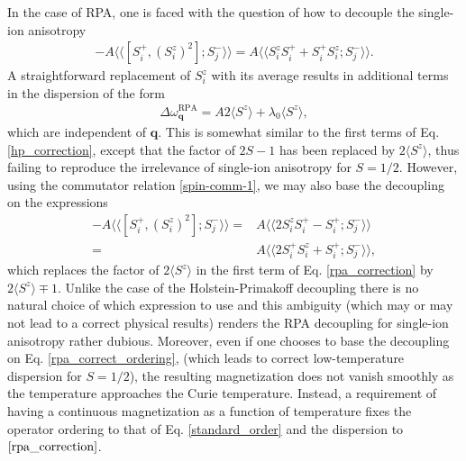 \documentclass[aps,prb,reprint,floatfix,superscriptaddress]{revtex4-2}
\begin{document}
In the case of RPA, 
one is faced with the question of how to decouple the single-ion anisotropy
\begin{align}\label{standard_order}
-A\langle\langle[S^+_i,(S^z_i)^2];S^-_j\rangle\rangle=A\langle\langle S^z_iS^+_i+S^+_iS^z_i;S^-_j\rangle\rangle.
\end{align}
A straightforward replacement of $S^z_i$ with its average
results in additional terms in the dispersion of the form
\begin{align}\label{rpa_correction}
    \Delta\omega^\mathrm{RPA}_\mathbf{q} =A2\langle S^z\rangle+\lambda_0\langle S^z\rangle,
\end{align}
which are independent of $\mathbf{q}$. This is somewhat similar to the first terms of Eq. \eqref{hp_correction}, except that the factor of $2S-1$ has been replaced by $2\langle S^z\rangle$, thus failing to reproduce the irrelevance of single-ion anisotropy for $S=1/2$. 
However, using the commutator relation \eqref{spin-comm-1}, we may also base the decoupling on the expressions
\begin{align}
-A\langle\langle[S^+_i,(S^z_i)^2];S^-_j\rangle\rangle=&A\langle\langle 2S^z_iS^+_i-S^+_i;S^-_j\rangle\rangle\label{rpa_correct_ordering}\\
=&A\langle\langle 2S^+_iS^z_i+S^+_i;S^-_j\rangle\rangle,
\end{align}
which replaces the factor of $2\langle S^z\rangle$ in the first term of Eq. \eqref{rpa_correction} by $2\langle S^z\rangle\mp1$. 
Unlike the case of the Holstein-Primakoff decoupling there is no natural choice of which expression to use and this ambiguity (which may or may not lead to a correct physical results) renders the RPA decoupling for single-ion anisotropy rather dubious. Moreover, even 
if one chooses to base the decoupling on Eq. \eqref{rpa_correct_ordering}, (which leads to correct low-temperature dispersion for $S=1/2$), 
the resulting magnetization does not vanish smoothly as the temperature approaches the Curie temperature. Instead, a requirement of having a continuous magnetization as a function of temperature fixes the operator ordering to that of Eq. \eqref{standard_order} and the dispersion to $\eqref{rpa_correction}$.
\end{document}

